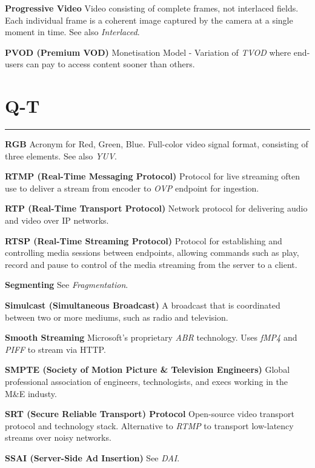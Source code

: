 \smallskip
\textbf{Progressive Video}
Video consisting of complete frames, not interlaced fields. Each individual frame is a coherent image captured by the camera at a single moment in time. See also \textit{Interlaced}.

\smallskip
\textbf{PVOD (Premium VOD)}
Monetisation Model - Variation of \textit{TVOD} where end-users can pay to access content sooner than others.


\section{Q-T}
\hrule

\medskip
\textbf{RGB}
Acronym for Red, Green, Blue. Full-color video signal format, consisting of three elements. See also \textit{YUV}.

\smallskip
\textbf{RTMP (Real-Time Messaging Protocol)}
Protocol for live streaming often use to deliver a stream from encoder to \textit{OVP} endpoint for ingestion.

\smallskip
\textbf{RTP (Real-Time Transport Protocol)}
Network protocol for delivering audio and video over IP networks.

\smallskip
\textbf{RTSP (Real-Time Streaming Protocol)}
Protocol for establishing and controlling media sessions between endpoints, allowing commands such as play, record and pause to control of the media streaming from the server to a client.

\smallskip
\textbf{Segmenting}
See \textit{Fragmentation}.

\smallskip
\textbf{Simulcast (Simultaneous Broadcast)}
A broadcast that is coordinated between two or more mediums, such as radio and television.

\smallskip
\textbf{Smooth Streaming}
Microsoft’s proprietary \textit{ABR} technology. Uses \textit{fMP4} and \textit{PIFF} to stream via HTTP.

\smallskip
\textbf{SMPTE (Society of Motion Picture \& Television Engineers)}
Global professional association of engineers, technologists, and execs working in the M\&E industy.

\smallskip
\textbf{SRT (Secure Reliable Transport) Protocol}
Open-source video transport protocol and technology stack. Alternative to \textit{RTMP} to transport low-latency streams over noisy networks.

\smallskip
\textbf{SSAI (Server-Side Ad Insertion)}
See \textit{DAI}.


